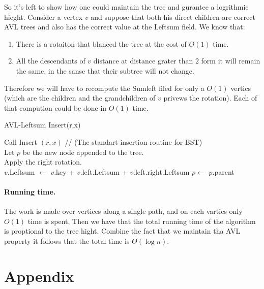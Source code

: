 So it's left to show how one could maintain the tree and gurantee a logrithmic hieght. Consider a vertex $v$ and suppose that both
his direct children are correct AVL trees and also has the correct value at the Leftsum field. We know that:
\begin{enumerate}
  \item There is a rotaiton that blanced the tree at the cost of $O(1)$ time.
  \item All the descendants of $v$ distance at distance grater than $2$ form it will remain the same, in the sanse that 
    their subtree will not change. 
\end{enumerate}
Therefore we will have to recompute the Sumleft filed for only a $O(1)$ vertics (which are the children and the grandchildren of $v$ privews the rotation). 
Each of that compution could be done in $O(1)$ time. 


\begin{algbox}{AVL-Leftsum Insert(r,x)}
  \begin{algorithm}[H]
    Call Insert $(r,x)$ // (The standart insertion routine for BST) \\  
    Let $p$ be the new node appended to the tree. \\
     {
      Apply the right rotation. \\
       {
	$v$.Leftsum $\leftarrow$ $v$.key + $v$.left.Leftsum + $v$.left.right.Leftsum 		
      }
      $p \leftarrow$ $p$.parent \\  
    }
  \end{algorithm}
\end{algbox}

\paragraph{Running time.} The work is made over vertices along a single path, and on each vartics only $O(1)$ time 
is spent, Then we have that the total running time of the algorithm is proptional to the tree hight. 
Combine the fact that we maintain tha AVL property it follows that the total time is $\Theta\left( \log n \right)$.  




\section*{Appendix}
